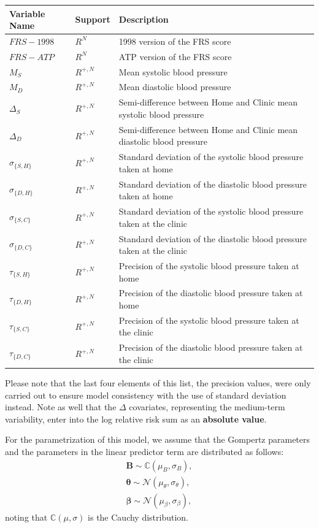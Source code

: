 \documentclass[
]{article}
\begin{document}
\begin{tabular}{lll}
\toprule
Variable Name & Support & Description\\
\midrule
$FRS-1998$ & $R^N$ & 1998 version of the FRS score\\
$FRS-ATP$ & $R^N$ & ATP version of the FRS score\\
$M_S$ & $R^{+,N}$ & Mean systolic blood pressure\\
$M_D$ & $R^{+,N}$ & Mean diastolic blood pressure\\
$\Delta_S$ & $R^{+,N}$ & Semi-difference between Home and Clinic mean systolic blood pressure\\
\addlinespace
$\Delta_D$ & $R^{+,N}$ & Semi-difference between Home and Clinic mean diastolic blood pressure\\
$\sigma_{\{S,H\}}$ & $R^{+,N}$ & Standard deviation of the systolic blood pressure taken at home\\
$\sigma_{\{D,H\}}$ & $R^{+,N}$ & Standard deviation of the diastolic blood pressure taken at home\\
$\sigma_{\{S,C\}}$ & $R^{+,N}$ & Standard deviation of the systolic blood pressure taken at the clinic\\
$\sigma_{\{D,C\}}$ & $R^{+,N}$ & Standard deviation of the diastolic blood pressure taken at the clinic\\
\addlinespace
$\tau_{\{S,H\}}$ & $R^{+,N}$ & Precision of the systolic blood pressure taken at home\\
$\tau_{\{D,H\}}$ & $R^{+,N}$ & Precision of the diastolic blood pressure taken at home\\
$\tau_{\{S,C\}}$ & $R^{+,N}$ & Precision of the systolic blood pressure taken at the clinic\\
$\tau_{\{D,C\}}$ & $R^{+,N}$ & Precision of the diastolic blood pressure taken at the clinic\\
\bottomrule
\end{tabular}

Please note that the last four elements of this list, the precision values, were only carried out to ensure model consistency with the use of standard deviation instead.
Note as well that the \(\Delta\) covariates, representing the medium-term variability, enter into the log relative risk sum as an \textbf{absolute value}.

For the parametrization of this model, we assume that the Gompertz parameters and the parameters in the linear predictor term are distributed as follows:
\begin{equation}\label{priorsS}
\begin{aligned}
  \boldsymbol{B}\sim\mathbb{C}(\mu_B,\sigma_B),\\
  \boldsymbol{\theta}\sim\mathcal{N}(\mu_\theta,\sigma_\theta),\\
  \boldsymbol{\beta}\sim \mathcal{N}(\mu_\beta,\sigma_\beta),
\end{aligned}
\end{equation}
noting that \(\mathbb{C}(\mu,\sigma)\) is the Cauchy distribution.
\end{document}
